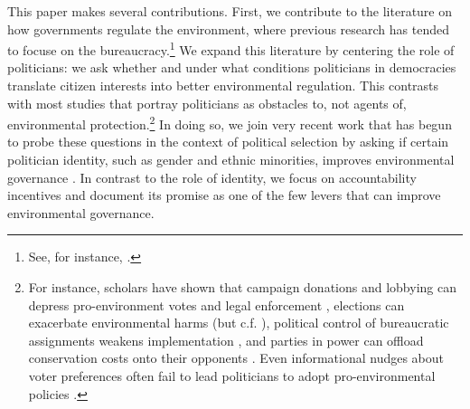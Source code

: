 \documentclass[12pt]{article}
\begin{document}
This paper makes several contributions. First, we contribute to the literature on how governments regulate the environment, where previous research has tended to focuse on the bureaucracy.\footnote{See, for instance, \cite{burgess2012political, lipscomb2016decentralization, shen2022political, dipoppa2024bureaucrat}.} We expand this literature by centering the role of politicians: we ask whether and under what conditions politicians in democracies translate citizen interests into better environmental regulation. This contrasts with most studies that portray politicians as obstacles to, not agents of, environmental protection.\footnote{For instance, scholars have shown that campaign donations and lobbying can depress pro-environment votes and legal enforcement \citep{mcalexander2020elections, stokes2020short, harding2024buying, gonzalez2024money}, elections can exacerbate environmental harms \citep{cao2019environmental, balboni2021cycles, sanford2023democratization} (but c.f. \citet{list2006elections}), political control of bureaucratic assignments weakens implementation \citep{xu2025bureaucratic}, and parties in power can offload conservation costs onto their opponents \citep{mangonnet2022playing}. Even informational nudges about voter preferences often fail to lead politicians to adopt pro-environmental policies \citep{hsiao2025climate}.} In doing so, we join very recent work that has begun to probe these questions in the context of political selection by asking if certain politician identity, such as gender and ethnic minorities, improves environmental governance \citep{mavisakalyan2019gender, baragwanath2024greener, gagliarducci2019hurricanes,bragancca2022cutting, gulzar2024representation, jagnani2021women}. In contrast to the role of identity, we focus on accountability incentives and document its promise as one of the few levers that can improve environmental governance.
\end{document}

